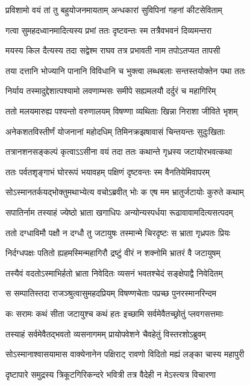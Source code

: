 \twolineshloka
{प्रविशामो वयं तां तु बहुयोजनमायताम्}
{अन्धकारां सुविपिनां गहनां कीटसेविताम्}


\twolineshloka
{गत्वा सुमहदध्वानमादित्यस्य प्रभां ततः}
{दृष्टवन्तः स्म तत्रैवभवनं दिव्यमन्तरा}


\twolineshloka
{मयस्य किल दैत्यस्य तदा सद्वेश्म राघव}
{तत्र प्रभावती नाम तपोऽतप्यत तापसी}


\twolineshloka
{तया दत्तानि भोज्यानि पानानि विविधानि च}
{भुक्त्वा लब्धबलाः सन्तस्तयोक्तेन पथा ततः}


\twolineshloka
{निर्याय तस्मादुद्देशात्पश्यामो लवणाम्भसः}
{समीपे सह्यमलयौ दर्दुरं च महागिरिम्}


\twolineshloka
{ततो मलयमारुह्य पश्यन्तो वरुणालयम्}
{विषण्णा व्यथिताः खिन्ना निराशा जीविते भृशम्}


\twolineshloka
{अनेकशतविस्तीर्णं योजनानां महोदधिम्}
{तिमिनक्रझषावासं चिन्तयन्तः सुदुःखिताः}


\twolineshloka
{तत्रानशनसङ्कल्पं कृत्वाऽऽसीना वयं तदा}
{ततः कथान्ते गृध्रस्य जटायोरभवत्कथा}


\twolineshloka
{ततः पर्वतशृङ्गाभं घोररूपं भयावहम्}
{पक्षिणं दृष्टवन्तः स्म वैनतियेमिवापरम्}


\twolineshloka
{सोऽस्मानतर्कयद्भोक्तुमथाभ्येत्य वचोऽब्रवीत्}
{भोः क एष मम भ्रातुर्जटायोः कुरुते कथाम्}


\twolineshloka
{सपातिर्नाम तस्याहं ज्येष्ठो भ्राता खगाधिपः}
{अन्योन्यस्पर्धया रूढावावामदित्यसत्पदम्}


\twolineshloka
{ततो दग्धाविमौ पक्षौ न दग्धौ तु जटायुषः}
{तस्मान्मे चिरदृष्टः स भ्राता गृध्रपतः प्रियः}


\twolineshloka
{निर्दग्धपक्षः पतितो ह्यहमस्मिन्महागिरौ}
{द्रष्टुं वीरं न शक्नोमि भ्रातरं वै जटायुषम्}


\twolineshloka
{तस्यैवं वदतोऽस्माभिर्हतो भ्राता निवेदितः}
{व्यसनं भवतश्चेदं सङ्क्षेपाद्वै निवेदितम्}


\twolineshloka
{स सम्पातिस्तदा राजञ्श्रुत्वासुमहदप्रियम्}
{विषण्णचेताः पप्रच्छ पुनरस्मानरिन्दम}


\twolineshloka
{कः सरामः कथं सीता जटायुश्च कथं हतः}
{इच्छामि सर्वमेवैतच्छ्रोतुं प्लवगसत्तमाः}


\twolineshloka
{तस्याहं सर्वमेवैतद्भवतो व्यसनागमम्}
{प्रायोपवेशने चैवहेतुं विस्तरशोऽब्रुवम्}


\twolineshloka
{सोऽस्मानाश्वासयामास वाक्येनानेन पक्षिराट्}
{रावणो विदितो मह्यं लङ्का चास्य महापुरी}


\twolineshloka
{दृष्टापारे समुद्रस्य त्रिकूटगिरिकन्दरे}
{भवित्री तत्र वैदेही न मेऽस्त्यत्र विचारणा}


